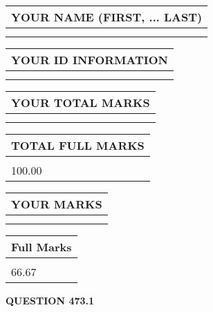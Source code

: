 \documentclass{ctexart}
\begin{document}
   
   
   
\newpage 
\setcounter{page}{ 
   473001 } 
   
   
   
   
\noindent\begin{tabular}{|l|}
\hline
YOUR NAME (FIRST, ... LAST)  \\
\hline
 \\ 
 \\ 
\hline
\end{tabular}
\hspace{0.05in} \begin{tabular}{|l|}
\hline
 YOUR   ID   INFORMATION  \\
\hline
 \\ 
 \\ 
\hline
\end{tabular}
   
   
\vspace{0.2in}\noindent\begin{tabular}{|l|}
\hline
YOUR TOTAL MARKS  \\
\hline
 \\ 
 \\ 
\hline
\end{tabular}
\hspace{0.05in} \begin{tabular}{|l|}
\hline
TOTAL FULL MARKS  \\
\hline
 \\ 
100.00 \\
\hline
\end{tabular}
   
   
 \vspace{0.2in}
 
 
 
 
   
   
  
\vspace{0.2in}
  
\noindent\begin{tabular}{|l|}
\hline
 YOUR MARKS  \\
\hline
 \\ 
 \\ 
\hline
\end{tabular}
\hspace{0.05in} \begin{tabular}{|l|}
\hline
 Full Marks  \\
\hline
 \\ 
66.67 \\
\hline
\end{tabular}
{\textbf{\Large{QUESTION
473.1 
}}}
  
\end{document}
